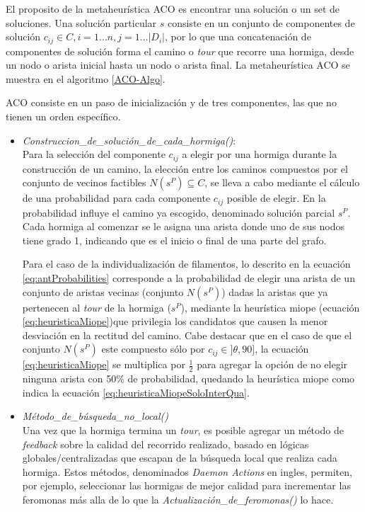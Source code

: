 El proposito de la metaheur\'istica ACO es encontrar una soluci\'on o un set de soluciones. Una soluci\'on particular $s$ consiste en un conjunto de componentes de soluci\'on $c_{ij} \in C, i = 1 \dotsc n, j = 1 \dotsc |D_i|$, por lo que una concatenaci\'on de componentes de soluci\'on forma el camino o {\it tour} que recorre una hormiga, desde un nodo o arista inicial hasta un nodo o arista final. La metaheur\'istica ACO se muestra en el algoritmo \ref{ACO-Algo}.

ACO consiste en un paso de inicializaci\'on y de tres componentes, las que no tienen un orden espec\'ifico.  

\begin{itemize}
    \item {\it Construccion\_de\_soluci\'on\_de\_cada\_hormiga()}: \\ 
    Para la selecci\'on del componente $c_{ij}$ a elegir por una hormiga durante la construcci\'on de un camino, la elecci\'on entre los caminos compuestos por el conjunto de vecinos factibles $N(s^{P}) \subseteq C$, se lleva a cabo mediante el c\'alculo de una probabilidad para cada componente $c_{ij}$ posible de elegir. En la probabilidad influye el camino ya escogido, denominado soluci\'on parcial $s^{P}$. Cada hormiga al comenzar se le asigna una arista donde uno de sus nodos tiene grado 1, indicando que es el inicio o final de una parte del grafo. 
    
    Para el caso de la individualizaci\'on de filamentos, lo descrito en la ecuaci\'on \ref{eq:antProbabilities} corresponde a la probabilidad de elegir una arista de un conjunto de aristas vecinas (conjunto $N(s^{P})$) dadas la aristas que ya pertenecen al {\it tour} de la hormiga ($s^P$), mediante la heur\'istica miope (ecuaci\'on \ref{eq:heuristicaMiope})que privilegia los candidatos que causen la menor desviaci\'on en la rectitud del camino. Cabe destacar que en el caso de que el conjunto $N(s^{P})$ este compuesto s\'olo por $c_{ij} \in ]\theta, 90]$, la ecuaci\'on \ref{eq:heuristicaMiope} se multiplica por $\frac{1}{2}$ para agregar la opci\'on de no elegir ninguna arista con 50\% de probabilidad, quedando la heur\'istica miope como indica la ecuaci\'on \ref{eq:heuristicaMiopeSoloInterQua}.
    
    
    \smallskip
    \item {\it M\'etodo\_de\_b\'usqueda\_no\_local()} \\
    Una vez que la hormiga termina un {\it tour}, es posible agregar un m\'etodo de {\it feedback} sobre la calidad del recorrido realizado, basado en l\'ogicas globales/centralizadas que escapan de la b\'usqueda local que realiza cada hormiga. Estos m\'etodos, denominados {\it Daemon Actions} en ingles, permiten, por ejemplo, seleccionar las hormigas de mejor calidad para incrementar las feromonas m\'as alla de lo que la {\it Actualizaci\'on\_de\_feromonas()} lo hace. 
    

\end{itemize}
